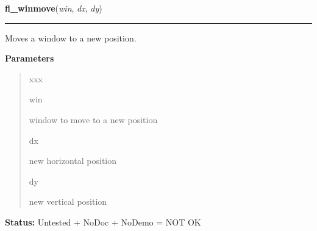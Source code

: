 \hspace{.8\funcindent}\begin{boxedminipage}{\funcwidth}

    \raggedright \textbf{fl\_winmove}(\textit{win}, \textit{dx}, \textit{dy})

    \vspace{-1.5ex}

    \rule{\textwidth}{0.5\fboxrule}
\setlength{\parskip}{2ex}
    Moves a window to a new position.

\setlength{\parskip}{1ex}
      \textbf{Parameters}
      \vspace{-1ex}

      \begin{quote}
        \begin{Ventry}{xxx}

          \item[win]

          window to move to a new position

          \item[dx]

          new horizontal position

          \item[dy]

          new vertical position

        \end{Ventry}

      \end{quote}

\textbf{Status:} Untested + NoDoc + NoDemo = NOT OK



    \end{boxedminipage}

    \label{xformslib:library:fl_winreshape}

    \vspace{0.5ex}

